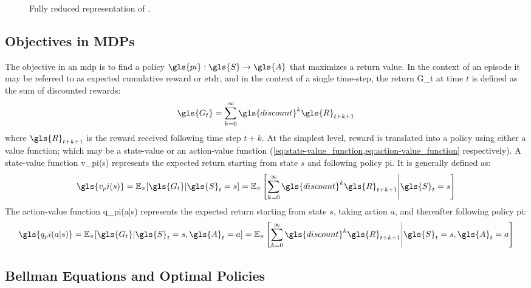 \begin{figure}
    \centering
    
    \caption{Fully reduced  
        representation of .}
    \label{fig:mdp_cycle}
\end{figure}

    \subsection*{Objectives in MDPs}%

The objective in an \gls{mdp} is to find a policy 
\(\gls{pi}: \gls{S} \rightarrow \gls{A}\) that maximizes a return value. 
In the context of an episode it may be referred to as expected cumulative 
reward or \gls{etdr}, and in the context of a single time-step, 
the return \gls{G_t} at time \(t\) is defined as the sum of discounted rewards:
\begin{equation}
    \gls{G_t} = \sum_{k=0}^{\infty} \gls{discount}^k \gls{R}_{t+k+1}
    \label{eq:sum_discounted_rewards}
\end{equation}
where \(\gls{R}_{t+k+1}\) is the reward received following time step \(t+k\).
At the simplest level, reward is translated into a policy using either a 
value function; which may be a state-value or an action-value function 
(\cref{eq:state-value_function,eq:action-value_function} respectively).
A state-value function \gls{v_pi(s)} represents the expected return starting 
from state \(s\) and following policy \gls{pi}. It is generally defined as:
\begin{equation}
    \gls{v_pi(s)} 
    = \mathbb{E}_\pi [\gls{G_t}| \gls{S}_t = s] = \mathbb{E}_\pi \left[
        \sum_{k=0}^{\infty} \gls{discount}^k \gls{R}_{t+k+1} 
        \middle| \gls{S}_t = s \right]
    \label{eq:state-value_function}
\end{equation}
The action-value function \gls{q_pi(a|s)} represents the expected return 
starting from state \(s\), taking action \(a\), 
and thereafter following policy \gls{pi}:
\begin{equation}
    \gls{q_pi(a|s)} 
    = \mathbb{E}_\pi [\gls{G_t}| \gls{S}_t = s, \gls{A}_t = a] 
    = \mathbb{E}_\pi \left[ 
        \sum_{k=0}^{\infty} \gls{discount}^k \gls{R}_{t+k+1}
        \middle| \gls{S}_t=s, \gls{A}_t=a \right]
    \label{eq:action-value_function}
\end{equation}

    \subsection*{Bellman Equations and Optimal Policies}%

